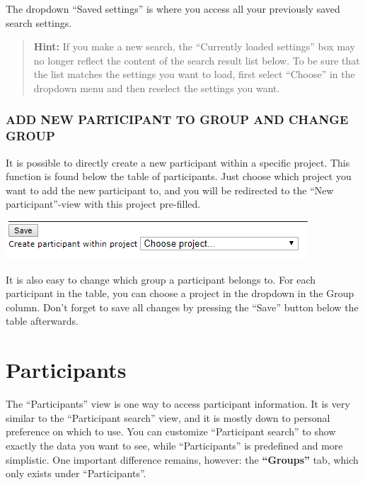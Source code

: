 \documentclass[]{book}
\begin{document}
The dropdown ``Saved settings'' is where you access all your previously saved search settings.

\begin{quote}
\textbf{Hint:} If you make a new search, the ``Currently loaded settings'' box may no longer reflect the content of the search result list below. To be sure that the list matches the settings you want to load, first select ``Choose'' in the dropdown menu and then reselect the settings you want.
\end{quote}

\hypertarget{add-new-participant-to-group-and-change-group}{%
\subsection{ADD NEW PARTICIPANT TO GROUP AND CHANGE GROUP}\label{add-new-participant-to-group-and-change-group}}

It is possible to directly create a new participant within a specific project. This function is found below the table of participants. Just choose which project you want to add the new participant to, and you will be redirected to the ``New participant''-view with this project pre-filled.

\includegraphics{images/add-new-participants.png}

It is also easy to change which group a participant belongs to. For each participant in the table, you can choose a project in the dropdown in the Group column. Don't forget to save all changes by pressing the ``Save'' button below the table afterwards.

\hypertarget{participants}{%
\chapter{Participants}\label{participants}}

The ``Participants'' view is one way to access participant information. It is very similar to the ``Participant search'' view, and it is mostly down to personal preference on which to use. You can customize ``Participant search'' to show exactly the data you want to see, while ``Participants'' is predefined and more simplistic. One important difference remains, however: the \textbf{``Groups''} tab, which only exists under ``Participants''.
\end{document}
